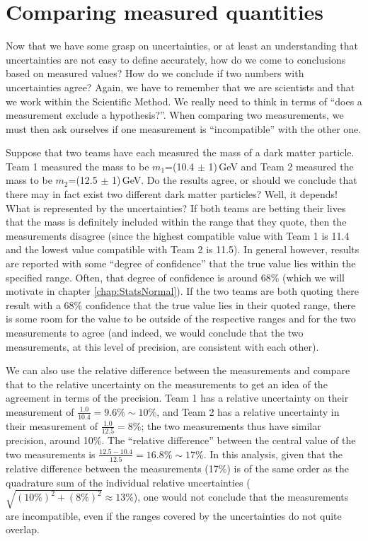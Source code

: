 \section{Comparing measured quantities}
Now that we have some grasp on uncertainties, or at least an understanding that uncertainties are not easy to define accurately, how do we come to conclusions based on measured values? How do we conclude if two numbers with uncertainties agree? Again, we have to remember that we are scientists and that we work within the Scientific Method. We really need to think in terms of ``does a measurement exclude a hypothesis?''. When comparing two measurements, we must then ask ourselves if one measurement is ``incompatible'' with the other one.

Suppose that two teams have each measured the mass of a dark matter particle. Team 1 measured the mass to be $m_1$=(10.4 $\pm$ 1)\,GeV and Team 2 measured the mass to be $m_2$=(12.5 $\pm$ 1)\,GeV. Do the results agree, or should we conclude that there may in fact exist two different dark matter particles? Well, it depends! What is represented by the uncertainties? If both teams are betting their lives that the mass is definitely included within the range that they quote, then the measurements disagree (since the highest compatible value with Team 1 is 11.4 and the lowest value compatible with Team 2 is 11.5). In general however, results are reported with some ``degree of confidence'' that the true value lies within the specified range. Often, that degree of confidence is around 68\% (which we will motivate in chapter \ref{chap:StatsNormal}). If the two teams are both quoting there result with a 68\% confidence that the true value lies in their quoted range, there is some room for the value to be outside of the respective ranges and for the two measurements to agree (and indeed, we would conclude that the two measurements, at this level of precision, are consistent with each other).

We can also use the relative difference between the measurements and compare that to the relative uncertainty on the measurements to get an idea of the agreement in terms of the precision. Team 1 has a relative uncertainty on their measurement of $\frac{1.0}{10.4}=9.6\%\sim 10\%$, and Team 2 has a relative uncertainty in their measurement of $\frac{1.0}{12.5}=8\%$; the two measurements thus have similar precision, around 10\%. The ``relative difference'' between the central value of the two measurements is $\frac{12.5-10.4}{12.5} = 16.8\% \sim 17\%$. In this analysis, given that the relative difference between the measurements (17\%) is of the same order as the quadrature sum of the individual relative uncertainties ($\sqrt{(10\%)^2+(8\%)^2}\approx 13\%$), one would not conclude that the measurements are incompatible, even if the ranges covered by the uncertainties do not quite overlap.


